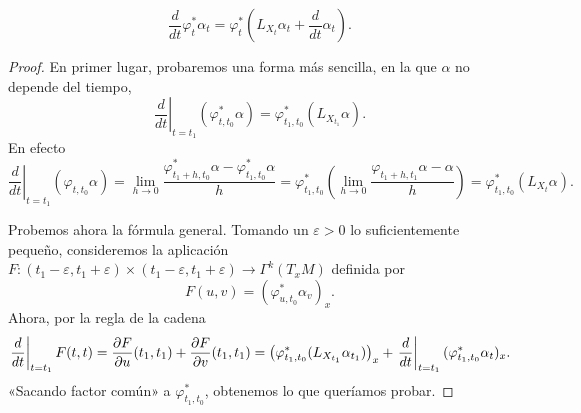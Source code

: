     \begin{equation*}
      \frac{d}{dt}\varphi^*_t \alpha_t = \varphi^*_t \left( L_{X_t}\alpha_t + \frac{d}{dt}\alpha_t \right).
    \end{equation*}

  \begin{proof}
    En primer lugar, probaremos una forma más sencilla, en la que $\alpha$ no depende del tiempo,
    \begin{equation*}
      \left.\frac{d}{dt}\right|_{t=t_1}(\varphi^*_{t,t_0}\alpha)=\varphi^*_{t_1,t_0}(L_{X_{t_1}}\alpha).
    \end{equation*}
    En efecto
    \begin{equation*}
      \left.\frac{d}{dt}\right|_{t=t_1}(\varphi_{t,t_0}\alpha)=\lim_{h\rightarrow 0}\frac{\varphi^*_{t_1+h,t_0}\alpha-\varphi^*_{t_1,t_0}\alpha}{h}=\varphi^*_{t_1,t_0}\left( \lim_{h\rightarrow 0 }\frac{\varphi_{t_1+h,t_1}\alpha-\alpha}{h} \right)=\varphi^*_{t_1,t_0}(L_{X_t}\alpha).
    \end{equation*}

    Probemos ahora la fórmula general. Tomando un $\varepsilon > 0$ lo suficientemente pequeño, consideremos la aplicación $F:(t_1-\varepsilon,t_1+\varepsilon)\times(t_1-\varepsilon,t_1+\varepsilon)\rightarrow\Gamma^k(T_xM)$ definida por
    \begin{equation*}
      F(u,v)=(\varphi^*_{u,t_0}\alpha_v)_x.
    \end{equation*}
    Ahora, por la regla de la cadena
    \begin{equation*}
      \left. \frac{d}{dt}\right|_{t=t_1}F(t,t)=\frac{\partial F}{\partial u}(t_1,t_1)+\frac{\partial F}{\partial v}(t_1,t_1)=\left(\varphi^*_{t_1,t_0}(L_{X_{t_1}}\alpha_{t_1})\right)_x+\left. \frac{d}{dt}\right|_{t=t_1}(\varphi^*_{t_1,t_0}\alpha_t)_x.
    \end{equation*}
    «Sacando factor común» a $\varphi^*_{t_1,t_0}$, obtenemos lo que queríamos probar.
  \end{proof}
